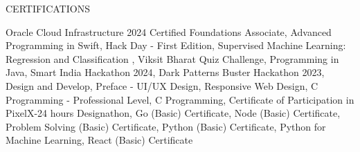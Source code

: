 \documentclass{resume}
\begin{document}
\begin{rSection}{CERTIFICATIONS}

    \begin{itemize}
         Oracle Cloud Infrastructure 2024 Certified Foundations Associate, Advanced Programming in Swift, Hack Day - First Edition, Supervised Machine Learning: Regression and Classification , Viksit Bharat Quiz Challenge, Programming in Java, Smart India Hackathon 2024, Dark Patterns Buster Hackathon 2023, Design and Develop, Preface - UI/UX Design, Responsive Web Design, C Programming - Professional Level, C Programming, Certificate of Participation in PixelX-24 hours Designathon, Go (Basic) Certificate, Node (Basic) Certificate, Problem Solving (Basic) Certificate, Python (Basic) Certificate, Python for Machine Learning, React (Basic) Certificate
    \end{itemize}
    
    \end{rSection}
    
    
    \vspace{1.5em}

    
    
\end{document}
